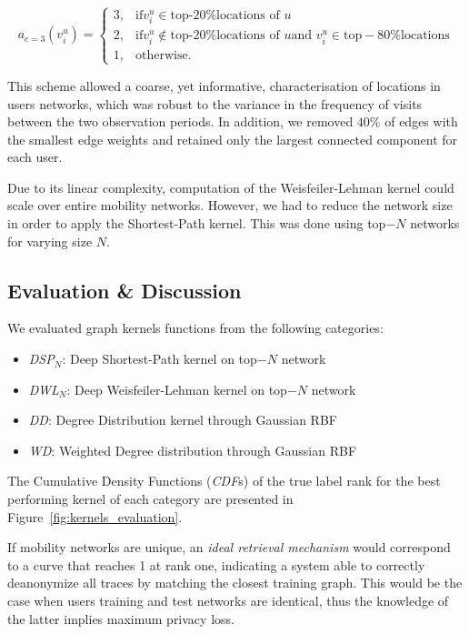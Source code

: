 \begin{equation*}
	a_{c=3}\left(v_i^u\right)=
	\begin{cases}
		 3, &  \mbox{if} v_i^u \in \mbox{top-20\% locations of } u  \\
		 2, &  \mbox{if} v_i^u  \notin \mbox{top-20}\% \mbox{locations of }  u   \mbox{and }  v_i^u \in \mbox{top}-80\% \mbox{locations}\\
		 1, &  \mbox{otherwise}.
	\end{cases}
\end{equation*}

This scheme allowed a coarse, yet informative, characterisation of locations in users networks, which was robust to the variance in the frequency of visits between the two observation periods. In addition, we removed $40\%$ of edges with the smallest edge weights and retained only the largest connected component for each user.


Due to its linear complexity, computation of the Weisfeiler-Lehman kernel could scale over entire mobility networks.
However, we had to reduce the network size in order to apply the Shortest-Path kernel.
This was done using top$-N$ networks for varying size $N$.



\subsection{Evaluation \& Discussion}

We evaluated graph kernels functions from the following categories:
\begin{itemize}
	\item \emph{DSP}$_{N}$: Deep Shortest-Path kernel on top$-N$ network
	\item \emph{DWL}$_{N}$: Deep Weisfeiler-Lehman kernel on top$-N$ network
	\item \emph{DD}: Degree Distribution kernel through Gaussian RBF
	\item \emph{WD}: Weighted Degree distribution through Gaussian RBF
\end{itemize}
The  Cumulative Density Functions (\emph{CDF}s) of the  true label rank for the best performing kernel of each category are presented in Figure~\ref{fig:kernels_evaluation}.

If mobility networks are unique, an \emph{ideal retrieval mechanism} would correspond to a curve that reaches 1 at rank one, indicating a system able to correctly deanonymize all traces by matching the closest training graph.
This would be the case when users training and test networks are identical, thus the knowledge of the latter implies maximum privacy loss.

